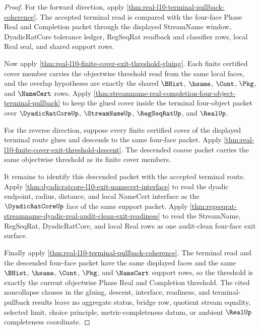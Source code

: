 \begin{proof}
For the forward direction, apply
\autoref{thm:real-l10-terminal-pullback-coherence}. The accepted terminal read
is compared with the four-face Phase Real and Completion packet through the
displayed StreamName window, DyadicRatCore tolerance ledger, RegSeqRat
readback and classifier rows, local Real seal, and shared support rows.

Now apply \autoref{thm:real-l10-finite-cover-exit-threshold-gluing}. Each
finite certified cover member carries the objectwise threshold read from the
same local faces, and the overlap hypotheses are exactly the shared
$\BHist$, $\hsame$, $\Cont$, $\Pkg$, and $\NameCert$ rows. Apply
\autoref{thm:streamname-real-completion-four-object-terminal-pullback} to keep
the glued cover inside the terminal four-object packet over
$\DyadicRatCoreUp$, $\StreamNameUp$, $\RegSeqRatUp$, and $\RealUp$.

For the reverse direction, suppose every finite certified cover of the
displayed terminal route glues and descends to the same four-face packet. Apply
\autoref{thm:real-l10-finite-cover-exit-threshold-descent}. The descended
coarse packet carries the same objectwise threshold as its finite cover
members.

It remains to identify this descended packet with the accepted terminal route.
Apply \autoref{thm:dyadicratcore-l10-exit-namecert-interface} to read the
dyadic endpoint, radius, distance, and local NameCert interface as the
$\DyadicRatCoreUp$ face of the same support packet. Apply
\autoref{thm:regseqrat-streamname-dyadic-real-audit-clean-exit-readiness} to
read the StreamName, RegSeqRat, DyadicRatCore, and local Real rows as one
audit-clean four-face exit surface.

Finally apply \autoref{thm:real-l10-terminal-pullback-coherence}. The terminal
read and the descended four-face packet have the same displayed faces and the
same $\BHist$, $\hsame$, $\Cont$, $\Pkg$, and $\NameCert$ support rows, so the
threshold is exactly the current objectwise Phase Real and Completion
threshold. The cited noncollapse clauses in the gluing, descent, interface,
readiness, and terminal-pullback results leave no aggregate status, bridge
row, quotient stream equality, selected limit, choice principle,
metric-completeness datum, or ambient $\RealUp$ completeness coordinate.
\end{proof}

